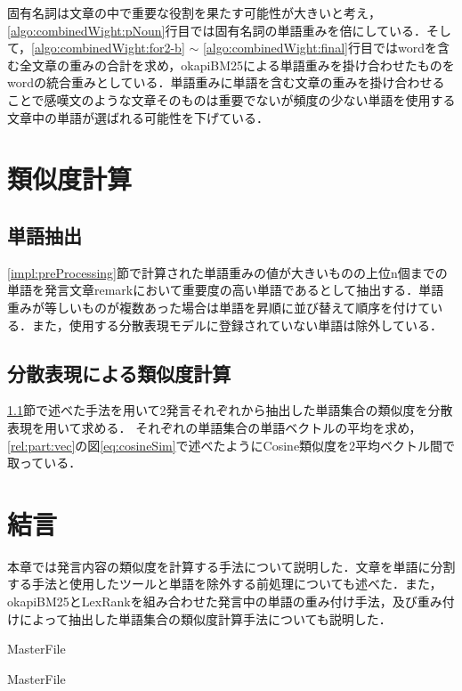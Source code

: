 固有名詞は文章の中で重要な役割を果たす可能性が大きいと考え，\ref{algo:combinedWight:pNoun}行目では固有名詞の単語重みを倍にしている．そして，\ref{algo:combinedWight:for2-b} $\sim$ \ref{algo:combinedWight:final}行目ではwordを含む全文章の重みの合計を求め，okapiBM25による単語重みを掛け合わせたものをwordの統合重みとしている．単語重みに単語を含む文章の重みを掛け合わせることで感嘆文のような文章そのものは重要でないが頻度の少ない単語を使用する文章中の単語が選ばれる可能性を下げている．
\section{類似度計算}
\label{impl:similarity}
\subsection{単語抽出}
\label{impl:similarity:extract}
\ref{impl:preProcessing}節で計算された単語重みの値が大きいものの上位n個までの単語を発言文章remarkにおいて重要度の高い単語であるとして抽出する．単語重みが等しいものが複数あった場合は単語を昇順に並び替えて順序を付けている．また，使用する分散表現モデルに登録されていない単語は除外している．
\subsection{分散表現による類似度計算}
\label{impl:similarity:wordEmbed}
\ref{impl:similarity:extract}節で述べた手法を用いて2発言それぞれから抽出した単語集合の類似度を分散表現を用いて求める．
それぞれの単語集合の単語ベクトルの平均を求め，\ref{rel:part:vec}の図\ref{eq:cosineSim}で述べたようにCosine類似度を2平均ベクトル間で取っている．
\section{結言}
\label{impl:conclusion}
本章では発言内容の類似度を計算する手法について説明した．文章を単語に分割する手法と使用したツールと単語を除外する前処理についても述べた．また，okapiBM25とLexRankを組み合わせた発言中の単語の重み付け手法，及び重み付けによって抽出した単語集合の類似度計算手法についても説明した．

 \expandafter\ifx\csname MasterFile\endcsname\relax
	\def\BibFile{hoge}
	
  \fi
  \expandafter\ifx\csname MasterFile\endcsname\relax
  
  \fi
